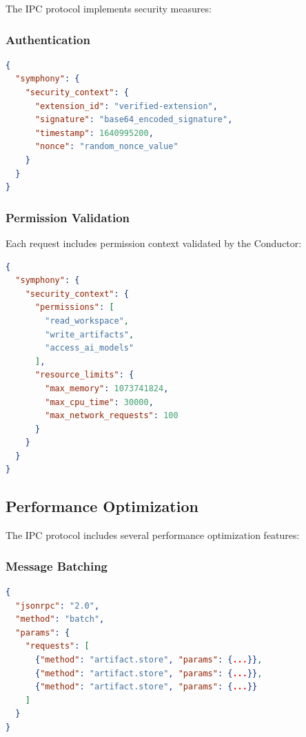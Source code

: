 The IPC protocol implements security measures:

\subsubsection*{Authentication}

\begin{lstlisting}[language=JSON,caption={Authentication Token Structure}]
{
  "symphony": {
    "security_context": {
      "extension_id": "verified-extension",
      "signature": "base64_encoded_signature",
      "timestamp": 1640995200,
      "nonce": "random_nonce_value"
    }
  }
}
\end{lstlisting}

\subsubsection*{Permission Validation}

Each request includes permission context validated by the Conductor:

\begin{lstlisting}[language=JSON,caption={Permission Context}]
{
  "symphony": {
    "security_context": {
      "permissions": [
        "read_workspace",
        "write_artifacts",
        "access_ai_models"
      ],
      "resource_limits": {
        "max_memory": 1073741824,
        "max_cpu_time": 30000,
        "max_network_requests": 100
      }
    }
  }
}
\end{lstlisting}

\subsection*{Performance Optimization}

The IPC protocol includes several performance optimization features:

\subsubsection*{Message Batching}

\begin{lstlisting}[language=JSON,caption={Batch Request Format}]
{
  "jsonrpc": "2.0",
  "method": "batch",
  "params": {
    "requests": [
      {"method": "artifact.store", "params": {...}},
      {"method": "artifact.store", "params": {...}},
      {"method": "artifact.store", "params": {...}}
    ]
  }
}
\end{lstlisting}

